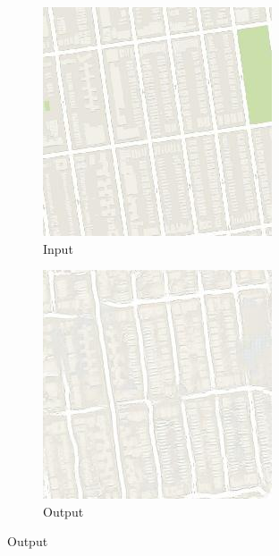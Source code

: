 \begin{figure}[ht]
  \begin{subfigure}[t]{.14\textwidth}
    \centering
    \caption*{Input}
    \includegraphics[width=\linewidth]{images/cycleGanResults/Maps19_Or_Ld120_E100_Lr0002.jpg}
  \end{subfigure}
  \begin{subfigure}[t]{.14\textwidth}
    \centering
    \caption*{Output}
    \includegraphics[width=\linewidth]{images/cycleGanResults/Maps19Ld120_E100_Lr0002.jpg}

\end{subfigure}
\end{figure}
